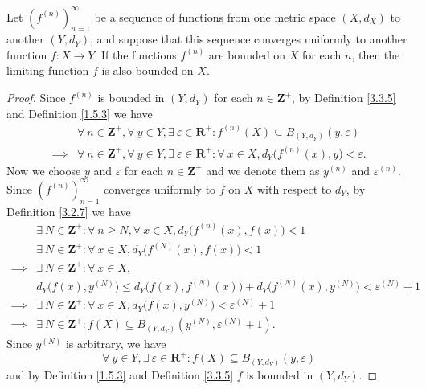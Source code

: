 \begin{proposition}\label{3.3.6}
    Let \((f^{(n)})_{n = 1}^\infty\) be a sequence of functions from one metric space \((X, d_X)\) to another \((Y, d_Y)\), and suppose that this sequence converges uniformly to another function \(f : X \to Y\).
    If the functions \(f^{(n)}\) are bounded on \(X\) for each \(n\), then the limiting function \(f\) is also bounded on \(X\).
\end{proposition}

\begin{proof}
    Since \(f^{(n)}\) is bounded in \((Y, d_Y)\) for each \(n \in \mathbf{Z}^+\), by Definition \ref{3.3.5} and Definition \ref{1.5.3} we have
    \begin{align*}
                 & \forall\ n \in \mathbf{Z}^+, \forall\ y \in Y, \exists\ \varepsilon \in \mathbf{R}^+ : f^{(n)}(X) \subseteq B_{(Y, d_Y)}(y, \varepsilon)           \\
        \implies & \forall\ n \in \mathbf{Z}^+, \forall\ y \in Y, \exists\ \varepsilon \in \mathbf{R}^+ : \forall\ x \in X, d_Y\big(f^{(n)}(x), y\big) < \varepsilon.
    \end{align*}
    Now we choose \(y\) and \(\varepsilon\) for each \(n \in \mathbf{Z}^+\) and we denote them as \(y^{(n)}\) and \(\varepsilon^{(n)}\).
    Since \((f^{(n)})_{n = 1}^\infty\) converges uniformly to \(f\) on \(X\) with respect to \(d_Y\), by Definition \ref{3.2.7} we have
    \begin{align*}
                 & \exists\ N \in \mathbf{Z}^+ : \forall\ n \geq N, \forall\ x \in X, d_Y\big(f^{(n)}(x), f(x)\big) < 1                     \\
                 & \exists\ N \in \mathbf{Z}^+ : \forall\ x \in X, d_Y\big(f^{(N)}(x), f(x)\big) < 1                                        \\
        \implies & \exists\ N \in \mathbf{Z}^+ : \forall\ x \in X,                                                                          \\
                 & d_Y\big(f(x), y^{(N)}\big) \leq d_Y\big(f(x), f^{(N)}(x)\big) + d_Y\big(f^{(N)}(x), y^{(N)}\big) < \varepsilon^{(N)} + 1 \\
        \implies & \exists\ N \in \mathbf{Z}^+ : \forall\ x \in X, d_Y\big(f(x), y^{(N)}\big) < \varepsilon^{(N)} + 1                       \\
        \implies & \exists\ N \in \mathbf{Z}^+ : f(X) \subseteq B_{(Y, d_Y)}(y^{(N)}, \varepsilon^{(N)} + 1).
    \end{align*}
    Since \(y^{(N)}\) is arbitrary, we have
    \[
        \forall\ y \in Y, \exists\ \varepsilon \in \mathbf{R}^+ : f(X) \subseteq B_{(Y, d_Y)}(y, \varepsilon)
    \]
    and by Definition \ref{1.5.3} and Definition \ref{3.3.5} \(f\) is bounded in \((Y, d_Y)\).
\end{proof}

